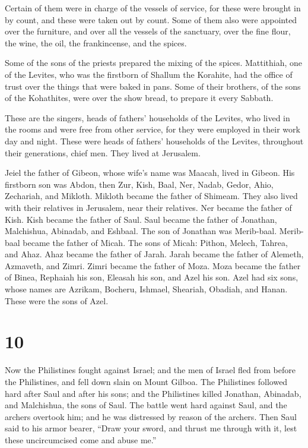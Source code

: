  Certain of them were in charge of the vessels of
service, for these were brought in by count, and these were taken out by
count.  Some of them also were appointed over the
furniture, and over all the vessels of the sanctuary, over the fine
flour, the wine, the oil, the frankincense, and the spices.

 Some of the sons of the priests prepared the mixing of
the spices.  Mattithiah, one of the Levites, who was the
firstborn of Shallum the Korahite, had the office of trust over the
things that were baked in pans.  Some of their brothers,
of the sons of the Kohathites, were over the show bread, to prepare it
every Sabbath.

 These are the singers, heads of fathers' households of
the Levites, who lived in the rooms and were free from other service,
for they were employed in their work day and night. 
These were heads of fathers' households of the Levites, throughout their
generations, chief men. They lived at Jerusalem.

 Jeiel the father of Gibeon, whose wife's name was
Maacah, lived in Gibeon.  His firstborn son was Abdon,
then Zur, Kish, Baal, Ner, Nadab,  Gedor, Ahio,
Zechariah, and Mikloth.  Mikloth became the father of
Shimeam. They also lived with their relatives in Jerusalem, near their
relatives.  Ner became the father of Kish. Kish became
the father of Saul. Saul became the father of Jonathan, Malchishua,
Abinadab, and Eshbaal.  The son of Jonathan was
Merib-baal. Merib-baal became the father of Micah.  The
sons of Micah: Pithon, Melech, Tahrea, and Ahaz.  Ahaz
became the father of Jarah. Jarah became the father of Alemeth,
Azmaveth, and Zimri. Zimri became the father of Moza. 
Moza became the father of Binea, Rephaiah his son, Eleasah his son, and
Azel his son.  Azel had six sons, whose names are
Azrikam, Bocheru, Ishmael, Sheariah, Obadiah, and Hanan. These were the
sons of Azel.

\hypertarget{section-9}{%
\section{10}\label{section-9}}

 Now the Philistines fought against Israel; and the men of
Israel fled from before the Philistines, and fell down slain on Mount
Gilboa.  The Philistines followed hard after Saul and
after his sons; and the Philistines killed Jonathan, Abinadab, and
Malchishua, the sons of Saul.  The battle went hard
against Saul, and the archers overtook him; and he was distressed by
reason of the archers.  Then Saul said to his armor
bearer, ``Draw your sword, and thrust me through with it, lest these
uncircumcised come and abuse me.''

